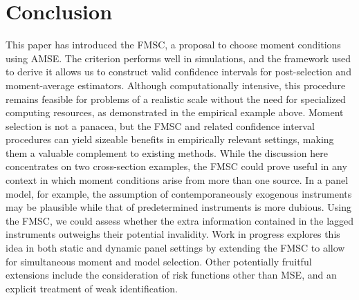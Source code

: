 \section{Conclusion}
\label{sec:conclude}
This paper has introduced the FMSC, a proposal to choose moment conditions using AMSE. 
The criterion performs well in simulations, and the framework used to derive it allows us to construct valid confidence intervals for post-selection and moment-average estimators.  
Although computationally intensive, this procedure remains feasible for problems of a realistic scale without the need for specialized computing resources, as demonstrated in the empirical example above.
Moment selection is not a panacea, but the FMSC and related confidence interval procedures can yield sizeable benefits in empirically relevant settings, making them a valuable complement to existing methods.
While the discussion here concentrates on two cross-section examples, the FMSC could prove useful in any context in which moment conditions arise from more than one source. 
In a panel model, for example, the assumption of contemporaneously exogenous instruments may be plausible while that of predetermined instruments is more dubious.
Using the FMSC, we could assess whether the extra information contained in the lagged instruments outweighs their potential invalidity. 
Work in progress explores this idea in both static and dynamic panel settings by extending the FMSC to allow for simultaneous moment and model selection.
Other potentially fruitful extensions include the consideration of risk functions other than MSE, and an explicit treatment of weak identification.

